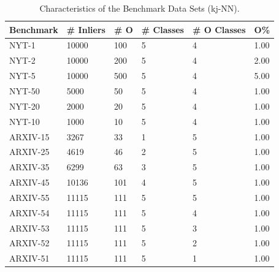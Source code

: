 \begin{table}[ht]
\caption{Characteristics of the Benchmark Data Sets (\acrshort{kj-NN}).}
\label{tab:data}
    \centering
    \footnotesize
\renewcommand{\arraystretch}{1.2}
\begin{tabularx}{0.9\columnwidth}{X|XXXXX}
Benchmark        & \# Inliers & \# O & \# Classes & \# O Classes & O\% \\ \toprule
NYT-1 & \num{10000}      & 100       & 5                 & 4                 & 1.00      \\ 
NYT-2 & \num{10000}      & 200       & 5                 & 4                 & 2.00       \\ 
NYT-5 & \num{10000}      & 500       & 5                 & 4                 & 5.00      \\ 
NYT-50  & \num{5000}       & 50         & 5                 & 4                 & 1.00      \\ 
NYT-20  & \num{2000}       & 20         & 5                 & 4                 & 1.00      \\ 
NYT-10  & \num{1000}       & 10         & 5                 & 4                 & 1.00      \\ \midrule
ARXIV-15 & \num{3267}      & 33       & 1                 & 5                 & 1.00      \\ 
ARXIV-25 & \num{4619}      & 46       & 2                 & 5                 & 1.00      \\ 
ARXIV-35 & \num{6299}      & 63       & 3                 & 5                 & 1.00      \\ 
ARXIV-45 & \num{10136}      & 101       & 4                 & 5                 & 1.00      \\
ARXIV-55 & \num{11115}      & 111       & 5                 & 5                 & 1.00      \\ 
ARXIV-54 & \num{11115}      & 111       & 5                 & 4                 & 1.00      \\ 
ARXIV-53 & \num{11115}      & 111       & 5                 & 3                 & 1.00      \\
ARXIV-52 & \num{11115}      & 111       & 5                 & 2                 & 1.00      \\  
ARXIV-51 & \num{11115}      & 111       & 5                 & 1                 & 1.00      \\ \bottomrule
\end{tabularx}
\end{table}

